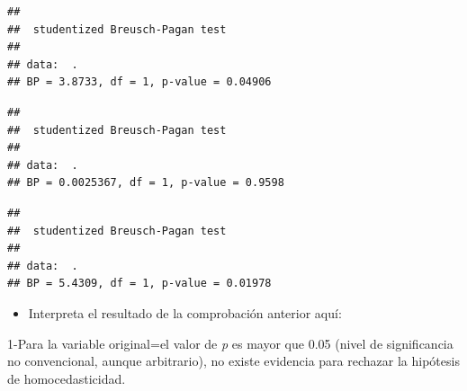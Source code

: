 \documentclass[11pt,]{article}
\newenvironment{Shaded}{\begin{snugshade}}{\end{snugshade}}
\newcommand{\KeywordTok}[1]{\textcolor[rgb]{0.13,0.29,0.53}{\textbf{#1}}}
\newcommand{\StringTok}[1]{\textcolor[rgb]{0.31,0.60,0.02}{#1}}
\newcommand{\OperatorTok}[1]{\textcolor[rgb]{0.81,0.36,0.00}{\textbf{#1}}}
\newcommand{\NormalTok}[1]{#1}
\providecommand{\tightlist}{%
\setlength{\itemsep}{0pt}\setlength{\parskip}{0pt}}
\begin{document}
\begin{Shaded}
\end{Shaded}

\begin{verbatim}
## 
##  studentized Breusch-Pagan test
## 
## data:  .
## BP = 3.8733, df = 1, p-value = 0.04906
\end{verbatim}

\begin{Shaded}
\end{Shaded}

\begin{verbatim}
## 
##  studentized Breusch-Pagan test
## 
## data:  .
## BP = 0.0025367, df = 1, p-value = 0.9598
\end{verbatim}

\begin{Shaded}
\end{Shaded}

\begin{verbatim}
## 
##  studentized Breusch-Pagan test
## 
## data:  .
## BP = 5.4309, df = 1, p-value = 0.01978
\end{verbatim}

\begin{itemize}
\tightlist
\item
  Interpreta el resultado de la comprobación anterior aquí:
\end{itemize}

1-Para la variable original=el valor de \emph{p} es mayor que 0.05
(nivel de significancia no convencional, aunque arbitrario), no existe
evidencia para rechazar la hipótesis de homocedasticidad.
\end{document}
